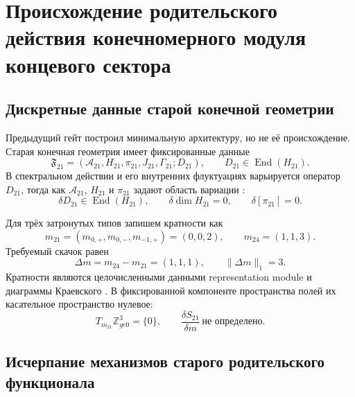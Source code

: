 \chapter{Происхождение родительского действия конечномерного модуля концевого сектора}
\label{ch:v9-endpoint-finite-module-parent-origin}

\section{Дискретные данные старой конечной геометрии}

Предыдущий гейт построил минимальную архитектуру, но не её происхождение.
Старая конечная геометрия имеет фиксированные данные
\begin{equation}
 \mathfrak F_{21}=(\mathcal A_{21},H_{21},\pi_{21},J_{21},\Gamma_{21};D_{21}),
 \qquad D_{21}\in\operatorname{End}(H_{21}).
 \label{eq:v9-endpoint-parent-fixed-triple}
\end{equation}
В спектральном действии и его внутренних флуктуациях варьируется оператор
$D_{21}$, тогда как $\mathcal A_{21}$, $H_{21}$ и $\pi_{21}$ задают область
вариации \cite{v9-endpoint-parent-spectral-action,v9-endpoint-parent-dynamic-triple}:
\begin{equation}
 \delta D_{21}\in\operatorname{End}(H_{21}),
 \qquad
 \delta\dim H_{21}=0,
 \qquad
 \delta[\pi_{21}]=0.
 \label{eq:v9-endpoint-parent-variation-domain}
\end{equation}

Для трёх затронутых типов запишем кратности как
\begin{equation}
 m_{21}=(m_{0,+},m_{0,-},m_{-1,+})=(0,0,2),
 \qquad
 m_{24}=(1,1,3).
 \label{eq:v9-endpoint-parent-multiplicity-vectors}
\end{equation}
Требуемый скачок равен
\begin{equation}
 \Delta m=m_{24}-m_{21}=(1,1,1),
 \qquad \lVert\Delta m\rVert_1=3.
 \label{eq:v9-endpoint-parent-multiplicity-jump}
\end{equation}
Кратности являются целочисленными данными representation module и диаграммы
Краевского \cite{v9-endpoint-parent-krajewski}. В фиксированной компоненте
пространства полей их касательное пространство нулевое:
\begin{equation}
 T_{m_{21}}\mathbb Z_{ge0}^{3}=\{0\},
 \qquad
 \frac{\delta S_{21}}{\delta m}\ \text{не определено}.
 \label{eq:v9-endpoint-parent-zero-multiplicity-tangent}
\end{equation}

\section{Исчерпание механизмов старого родительского функционала}

